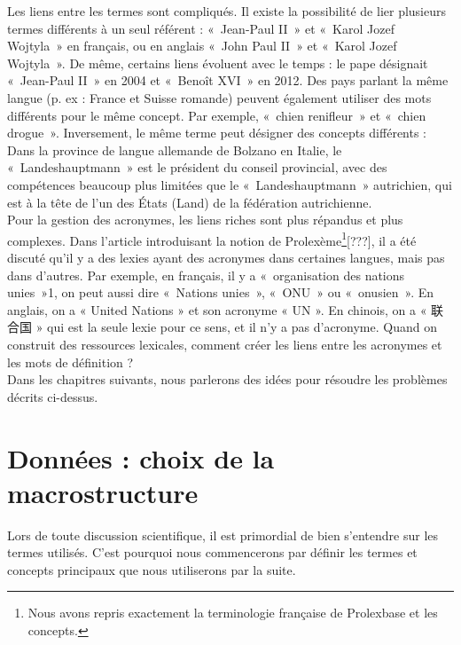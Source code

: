 \documentclass[10pt,a4paper,twoside]{article}
\newcommand{\Chinois}[1]{{\fontspec[Scale=0.9]{STSong}#1}}
\begin{document}
Les liens entre les termes sont compliqués. Il existe la possibilité de lier plusieurs termes différents à un seul référent : « Jean-Paul II » et « Karol Jozef Wojtyla » en français, ou en anglais « John Paul II » et « Karol Jozef Wojtyla ». De même, certains liens évoluent avec le temps : le pape désignait « Jean-Paul II » en 2004 et « Benoît XVI » en 2012. Des pays parlant la même langue (p. ex : France et Suisse romande) peuvent également utiliser des mots différents pour le même concept. Par exemple, « chien renifleur » et « chien drogue ». Inversement, le même terme peut désigner des concepts différents : Dans la province de langue allemande de Bolzano en Italie, le « Landeshauptmann » est le président du conseil provincial, avec des compétences beaucoup plus limitées que le « Landeshauptmann » autrichien, qui est à la tête de l'un des États (Land) de la fédération autrichienne. \\
Pour la gestion des acronymes, les liens riches sont plus répandus et plus complexes. Dans l'article introduisant la notion de Prolexème\footnote{Nous avons repris exactement la terminologie française de Prolexbase et les concepts.}[???], il a été discuté qu'il y a des lexies ayant des acronymes dans certaines langues, mais pas dans d'autres. Par exemple, en français, il y a « organisation des nations unies »1, on peut aussi dire « Nations unies », « ONU » ou « onusien ». En anglais, on a « United Nations » et son acronyme « UN ». En chinois, on a « \Chinois{联合国} » qui est la seule lexie pour ce sens, et il n'y a pas d'acronyme. Quand on construit des ressources lexicales, comment créer les liens entre les acronymes et les mots de définition ? \\
Dans les chapitres suivants, nous parlerons des idées pour résoudre les problèmes décrits ci-dessus. 

\section{Données : choix de la macrostructure}
Lors de toute discussion scientifique, il est primordial de bien s'entendre sur les termes utilisés. C'est pourquoi nous commencerons par définir les termes et concepts principaux que nous utiliserons par la suite. \\
\end{document}
